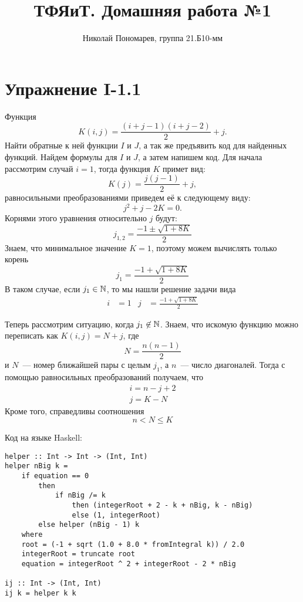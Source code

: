 \documentclass[12pt, oneside]{memoir}
\title{ТФЯиТ. Домашняя работа №1}
\author{Николай Пономарев, группа 21.Б10-мм}
\begin{document}
\maketitle

\section*{Упражнение I-1.1}

\begin{solution}
    {Функция \[K(i, j) = \frac{(i + j - 1) (i + j - 2)}{2} + j.\]}
    {Найти обратные к ней функции $I$ и $J$, а так же предъявить код для найденных функций.}
    {Найдем формулы для $I$ и $J$, а затем напишем код.}
    Для начала рассмотрим случай $i = 1$, тогда функция $K$ примет вид:
    \[K(j) = \frac{j (j - 1)}{2} + j,\]
    равносильными преобразованиями приведем её к следующему виду:
    \[j^2 + j - 2K = 0.\]
    Корнями этого уравнения относительно $j$ будут:
    \[j_{1, 2} = \frac{-1 \pm \sqrt{1 + 8 K}}{2}\]
    Знаем, что минимальное значение $K = 1$, поэтому можем вычислять только корень
    \[j_1 = \frac{-1 + \sqrt{1 + 8 K}}{2}\]
    В таком случае, если $j_1 \in \mathbb{N}$, то мы нашли решение задачи вида
    \begin{align*}
        i & = 1 & j & =\frac{-1 + \sqrt{1 + 8 K}}{2}
    \end{align*}

    Теперь рассмотрим ситуацию, когда $j_1 \not\in \mathbb{N}$.
    Знаем, что искомую функцию можно переписать как $K(i,j) = N + j$, где
    \[N = \frac{n(n-1)}{2}\]
    и $N$~--- номер ближайшей пары с целым $j_1$, а $n$~--- число диагоналей.
    Тогда с помощью равносильных преобразований получаем, что
    \begin{gather*}
        i = n - j + 2 \\
        j = K - N
    \end{gather*}
    Кроме того, справедливы соотношения
    \[n < N \le K\]

    Код на языке Haskell:
\end{solution}
\begin{verbatim}
helper :: Int -> Int -> (Int, Int)
helper nBig k =
    if equation == 0
        then
            if nBig /= k
                then (integerRoot + 2 - k + nBig, k - nBig)
                else (1, integerRoot)
        else helper (nBig - 1) k
    where
    root = (-1 + sqrt (1.0 + 8.0 * fromIntegral k)) / 2.0
    integerRoot = truncate root
    equation = integerRoot ^ 2 + integerRoot - 2 * nBig

ij :: Int -> (Int, Int)
ij k = helper k k
\end{verbatim}
\end{document}
